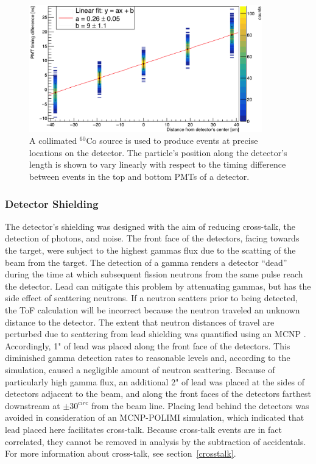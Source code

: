 \begin{figure}
    \centering
    \includegraphics[width = 0.9\textwidth]{Content/Methods/PMTDifference.png}
    \caption{A collimated $^{60}$Co source is used to produce events at precise locations on the detector.
    The particle's position along the detector's length is shown to vary linearly with respect to the timing difference between events in the top and bottom PMTs of a detector.}
    \label{fig:PMTDifference}
\end{figure}
\subsubsection{Detector Shielding}
The detector's shielding was designed with the aim of reducing cross-talk, the detection of photons, and noise.
The front face of the detectors, facing towards the target, were subject to the highest gammas flux due to the scatting of the beam from the target.
The detection of a gamma renders a detector ``dead'' during the time at which subsequent fission neutrons from the same pulse reach the detector.
Lead can mitigate this problem by attenuating gammas, but has the side effect of scattering neutrons.
If a neutron scatters prior to being detected, the ToF calculation will be incorrect because the neutron traveled an unknown distance to the detector.
The extent that neutron distances of travel are perturbed due to scattering from lead shielding was quantified using an MCNP .
Accordingly, 1" of lead was placed along the front face of the detectors.
This diminished gamma detection rates to reasonable levels and, according to the simulation, caused a negligible amount of neutron scattering.
Because of particularly high gamma flux, an additional 2" of lead was placed at the sides of detectors adjacent to the beam, and along the front faces of the detectors farthest downstream at $\pm30^{circ}$ from the beam line.
Placing lead behind the detectors was avoided in consideration of an MCNP-POLIMI simulation, which indicated that lead placed here facilitates cross-talk.
Because cross-talk events are in fact correlated, they cannot be removed in analysis by the subtraction of accidentals.
For more information about cross-talk, see section~\ref{crosstalk}.

